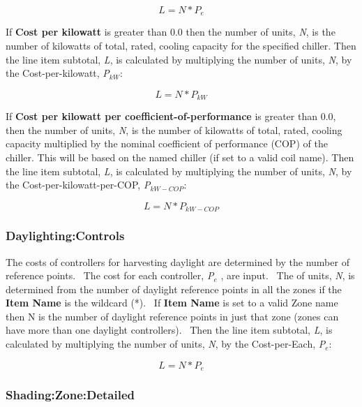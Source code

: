 \begin{equation}
L = N * {P_e}
\end{equation}

If \textbf{Cost per kilowatt} is greater than 0.0 then the number of units, \emph{N}, is the number of kilowatts of total, rated, cooling capacity for the specified chiller. Then the line item subtotal, \emph{L}, is calculated by multiplying the number of units, \emph{N}, by the Cost-per-kilowatt, \emph{P\(_{kW}\)}:

\begin{equation}
L = N * {P_{kW}}
\end{equation}

If \textbf{Cost per kilowatt per coefficient-of-performance} is greater than 0.0, then the number of units, \emph{N}, is the number of kilowatts of total, rated, cooling capacity multiplied by the nominal coefficient of performance (COP) of the chiller. This will be based on the named chiller (if set to a valid coil name). Then the line item subtotal, \emph{L}, is calculated by multiplying the number of units, \emph{N}, by the Cost-per-kilowatt-per-COP, \emph{P\(_{kW-COP}\)}:

\begin{equation}
L = N * {P_{kW - COP}}
\end{equation}

\subsubsection{Daylighting:Controls}\label{daylightingcontrols}

The costs of controllers for harvesting daylight are determined by the number of reference points.~ The cost for each controller, \emph{P\(_{e}\)} , are input.~ The of units, \emph{N}, is determined from the number of daylight reference points in all the zones if the \textbf{Item Name} is the wildcard (*).~ If \textbf{Item Name} is set to a valid Zone name then N is the number of daylight reference points in just that zone (zones can have more than one daylight controllers).~ Then the line item subtotal, \emph{L}, is calculated by multiplying the number of units, \emph{N}, by the Cost-per-Each, \emph{P\(_{e}\)}:

\begin{equation}
L = N * {P_e}
\end{equation}

\subsubsection{Shading:Zone:Detailed}\label{shadingzonedetailed}

